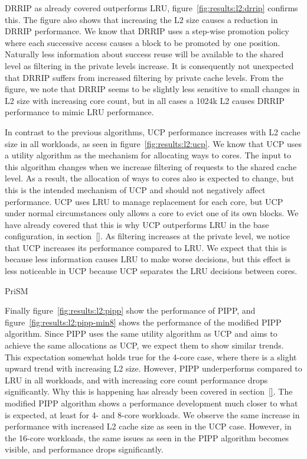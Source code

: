 DRRIP as already covered outperforms LRU, figure~\ref{fig:results:l2:drrip} confirms this.
The figure also shows that increasing the L2 size causes a reduction in DRRIP performance.
We know that DRRIP uses a step-wise promotion policy where each successive access causes a block to be promoted by one position.
Naturally less information about success reuse will be available to the shared level as filtering in the private levels increase.
It is consequently not unexpected that DRRIP suffers from increased filtering by private cache levels.
From the figure, we note that DRRIP seems to be slightly less sensitive to small changes in L2 size with increasing core count, but in all cases a 1024k L2 causes DRRIP performance to mimic LRU performance.

In contrast to the previous algorithms, UCP performance increases with L2 cache size in all workloads, as seen in figure~\ref{fig:results:l2:ucp}.
We know that UCP uses a utility algorithm as the mechanism for allocating ways to cores. 
The input to this algorithm changes when we increase filtering of requests to the shared cache level.
As a result, the allocation of ways to cores also is expected to change, but this is the intended mechanism of UCP and should not negatively affect performance.
UCP uses LRU to manage replacement for each core, but UCP under normal circumstances only allows a core to evict one of its own blocks. 
We have already covered that this is why UCP outperforms LRU in the base configuration, in section~\ref{}. 
As filtering increases at the private level, we notice that UCP increases its performance compared to LRU. 
We expect that this is because less information causes LRU to make worse decisions, but this effect is less noticeable in UCP because UCP separates the LRU decisions between cores.

PriSM~\todo{}

Finally figure~\ref{fig:results:l2:pipp} show the performance of PIPP, and figure~\ref{fig:results:l2:pipp-min8} shows the performance of the modified PIPP algorithm.
Since PIPP uses the same utility algorithm as UCP and aims to achieve the same allocations as UCP, we expect them to show similar trends.
This expectation somewhat holds true for the 4-core case, where there is a slight upward trend with increasing L2 size.
However, PIPP underperforms compared to LRU in all workloads, and with increasing core count performance drops significantly.
Why this is happening has already been covered in section~\ref{}.
The modified PIPP algorithm shows a performance development much closer to what is expected, at least for 4- and 8-core workloads.
We observe the same increase in performance with increased L2 cache size as seen in the UCP case. 
However, in the 16-core workloads, the same issues as seen in the PIPP algorithm becomes visible, and performance drops significantly.



